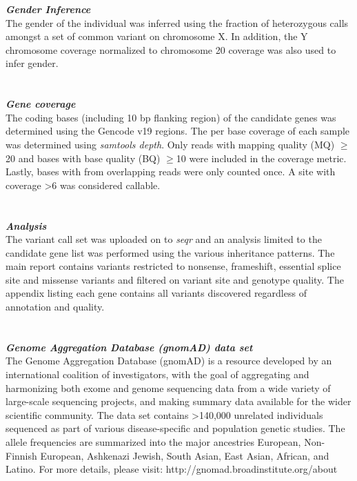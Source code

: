 {\large \textbf{\textit{Gender Inference}}}
\\
The gender of the individual was inferred using the fraction of heterozygous calls amongst a set of common variant on chromosome X. In addition, the Y chromosome coverage 
normalized to chromosome 20 coverage was also used to infer gender.
\\ \\ \\
{\large \textbf{\textit{Gene coverage}}}
\\
The coding bases (including 10 bp flanking region) of the candidate genes was determined using the Gencode v19 regions. The per base coverage of each
sample was determined using \textit{samtools depth}. Only reads with mapping quality (MQ) $\geq$20 and bases with base quality (BQ) $\geq$10
were included in the coverage metric. Lastly, bases with from overlapping reads were only counted once. A site with coverage \textgreater6 was considered
callable.  
\\ \\ \\
{\large \textbf{\textit{Analysis}}}
\\
The variant call set was uploaded on to \textit{seqr} and an analysis limited to the candidate gene list was performed using the various 
inheritance patterns. The main report contains variants restricted to nonsense, frameshift, essential splice site and missense variants and filtered on variant site and genotype quality. The appendix listing each gene contains all variants discovered regardless of annotation and quality.
\\ \\ \\
{\large \textbf{\textit{Genome Aggregation Database (gnomAD) data set}}}
\\
The Genome Aggregation Database (gnomAD) is a resource developed by an international coalition of investigators, with the goal of aggregating and harmonizing both exome and genome sequencing data from a wide variety of large-scale sequencing projects, and making summary data available for the wider scientific community. The data set contains \textgreater140,000 unrelated individuals sequenced as part of various disease-specific and population genetic studies. The allele frequencies are summarized into the major ancestries European, Non-Finnish European, Ashkenazi Jewish,  South Asian, East Asian, African, and Latino. For more details, please visit: http://gnomad.broadinstitute.org/about
\\ \\ \\

